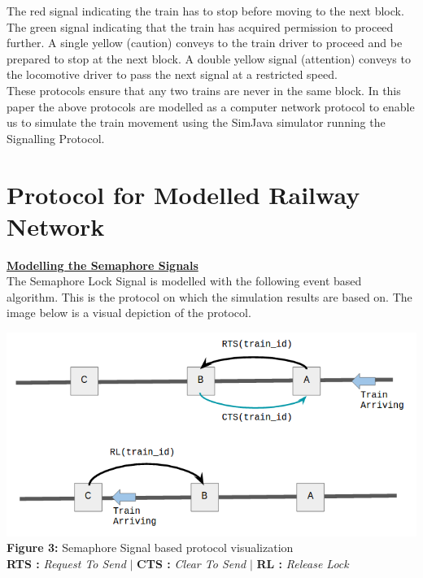\documentclass[twoside,11pt]{article}
\begin{document}
The red signal indicating the train has to stop before moving to the next
block. The green signal indicating that the train has acquired permission to
proceed further. A single yellow (caution) conveys to the train driver 
to proceed and be prepared to stop at the next block. A double yellow signal (attention) conveys to the locomotive driver to pass the next signal at a 	restricted speed. \\
\indent These protocols ensure that any two trains are never in the same block. In this paper the above protocols are modelled as a computer network protocol to enable us to simulate the train movement using the SimJava simulator running the Signalling Protocol.

\section{Protocol for Modelled Railway Network}

\underline{\bf Modelling the Semaphore Signals } \vspace{0.1in} \\
The Semaphore Lock Signal is modelled with the following event based algorithm. This is the protocol on which the simulation results are based on. The image below is a visual depiction of the protocol. 
\begin{center}
	\includegraphics[scale=0.46]{img/semaphore_protocol.png} \\
	{\bf Figure 3:} Semaphore Signal based protocol visualization  \\ \vspace{0.05in}
	{\bf RTS :} {\em Request To Send} $|$
{\bf CTS :} { \em Clear To Send} $|$
{\bf RL  :} { \em Release Lock  }
\end{center}
\end{document}
